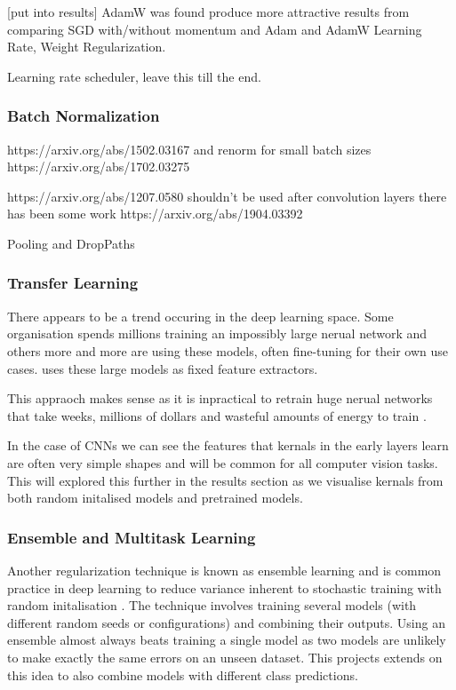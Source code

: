 [put into results]
AdamW was found produce more attractive results from comparing SGD with/without momentum and Adam and AdamW \cite{}
Learning Rate, Weight Regularization.

Learning rate scheduler, leave this till the end.

\subsubsection{Batch Normalization}
https://arxiv.org/abs/1502.03167 and renorm for small batch sizes https://arxiv.org/abs/1702.03275

https://arxiv.org/abs/1207.0580 shouldn't be used after convolution layers \cite{} there has been some work https://arxiv.org/abs/1904.03392

Pooling and DropPaths

\subsubsection{Transfer Learning}
There appears to be a trend occuring in the deep learning space.  Some organisation spends millions training an impossibly large nerual network
and others more and more are using these models, often fine-tuning for their own use cases.  \cite{} uses these large models as fixed feature extractors.

This appraoch makes sense as it is inpractical to retrain huge nerual networks that take weeks, millions of dollars and wasteful amounts of energy
to train \cite{}.

In the case of CNNs we can see the features that kernals in the early layers learn \cite{} are often very simple shapes and will be common for all
computer vision tasks.  This will explored this further in the results section as we visualise kernals from both random initalised models and 
pretrained models.

\subsubsection{Ensemble and Multitask Learning}
Another regularization technique is known as ensemble learning and is common practice in deep learning to reduce variance inherent to stochastic training 
with random initalisation \cite{deeplearningbook}.  The technique involves training several models (with different random seeds or configurations) and 
combining their outputs. Using an ensemble almost always beats training a single model as two models are unlikely to make exactly the same errors on an unseen dataset.
This projects extends on this idea to also combine models with different class predictions.

